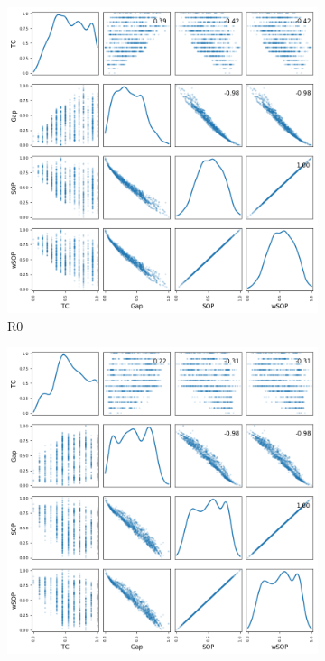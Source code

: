 \begin{figure}[!htbp]	
	\begin{adjustwidth}{-1cm}{-1cm}
	\centering
	\begin{subfigure}{0.35\textwidth}
		\includegraphics[width=\columnwidth]{Figure/NumGaps_SOP_TC_wSOP/precomputedInit/R0/fig/scatter_mattrix}
		\caption{R0}
	\end{subfigure}	
	\begin{subfigure}{0.35\textwidth}
		\includegraphics[width=\columnwidth]{Figure/NumGaps_SOP_TC_wSOP/precomputedInit/R4/fig/scatter_mattrix}

\end{subfigure}
\end{adjustwidth}
\end{figure}

